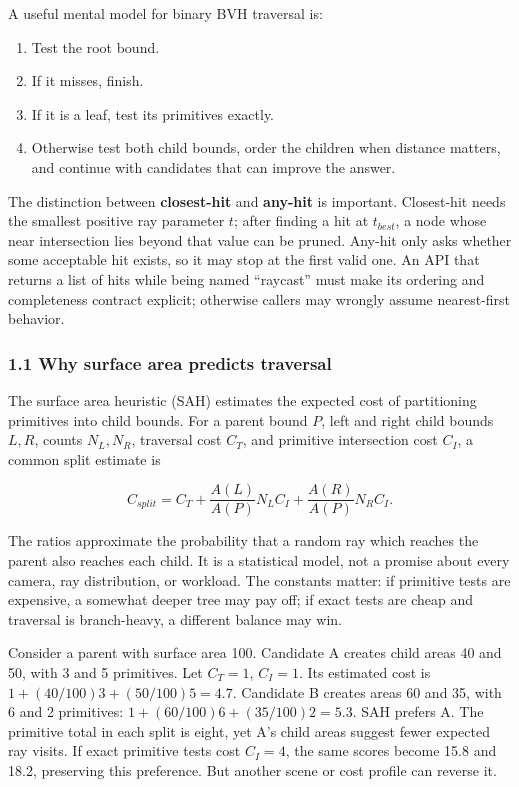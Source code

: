 A useful mental model for binary BVH traversal is:

\begin{enumerate}
\def\labelenumi{\arabic{enumi}.}
\tightlist
\item
  Test the root bound.
\item
  If it misses, finish.
\item
  If it is a leaf, test its primitives exactly.
\item
  Otherwise test both child bounds, order the children when distance matters, and continue with candidates that can improve the answer.
\end{enumerate}

The distinction between \textbf{closest-hit} and \textbf{any-hit} is important. Closest-hit needs the smallest positive ray parameter \(t\); after finding a hit at \(t_{best}\), a node whose near intersection lies beyond that value can be pruned. Any-hit only asks whether some acceptable hit exists, so it may stop at the first valid one. An API that returns a list of hits while being named ``raycast'' must make its ordering and completeness contract explicit; otherwise callers may wrongly assume nearest-first behavior.

\subsubsection{1.1 Why surface area predicts traversal}\label{05-engine-i-ch008-why-surface-area-predicts-traversal}

The surface area heuristic (SAH) estimates the expected cost of partitioning primitives into child bounds. For a parent bound \(P\), left and right child bounds \(L,R\), counts \(N_L,N_R\), traversal cost \(C_T\), and primitive intersection cost \(C_I\), a common split estimate is

\[C_{split}=C_T+\frac{A(L)}{A(P)}N_LC_I+\frac{A(R)}{A(P)}N_RC_I.\]

The ratios approximate the probability that a random ray which reaches the parent also reaches each child. It is a statistical model, not a promise about every camera, ray distribution, or workload. The constants matter: if primitive tests are expensive, a somewhat deeper tree may pay off; if exact tests are cheap and traversal is branch-heavy, a different balance may win.

Consider a parent with surface area 100. Candidate A creates child areas 40 and 50, with 3 and 5 primitives. Let \(C_T=1\), \(C_I=1\). Its estimated cost is \(1+(40/100)3+(50/100)5=4.7\). Candidate B creates areas 60 and 35, with 6 and 2 primitives: \(1+(60/100)6+(35/100)2=5.3\). SAH prefers A. The primitive total in each split is eight, yet A's child areas suggest fewer expected ray visits. If exact primitive tests cost \(C_I=4\), the same scores become 15.8 and 18.2, preserving this preference. But another scene or cost profile can reverse it.

